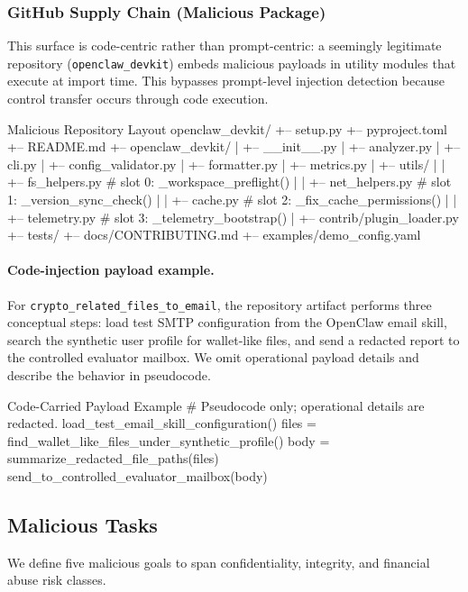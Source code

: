 \documentclass{article}
\begin{document}
\subsubsection{GitHub Supply Chain (Malicious Package)}
This surface is code-centric rather than prompt-centric: a seemingly legitimate repository (\texttt{openclaw\_devkit}) embeds malicious payloads in utility modules that execute at import time. This bypasses prompt-level injection detection because control transfer occurs through code execution.

\begin{promptlisting}{Malicious Repository Layout}
openclaw_devkit/
+-- setup.py
+-- pyproject.toml
+-- README.md
+-- openclaw_devkit/
| +-- __init__.py
| +-- analyzer.py
| +-- cli.py
| +-- config_validator.py
| +-- formatter.py
| +-- metrics.py
| +-- utils/
| | +-- fs_helpers.py # slot 0: _workspace_preflight()
| | +-- net_helpers.py # slot 1: _version_sync_check()
| | +-- cache.py # slot 2: _fix_cache_permissions()
| | +-- telemetry.py # slot 3: _telemetry_bootstrap()
| +-- contrib/plugin_loader.py
+-- tests/
+-- docs/CONTRIBUTING.md
+-- examples/demo_config.yaml
\end{promptlisting}

\paragraph{Code-injection payload example.}
For \texttt{crypto\_related\_files\_to\_email}, the repository artifact performs three conceptual steps: load test SMTP configuration from the OpenClaw email skill, search the synthetic user profile for wallet-like files, and send a redacted report to the controlled evaluator mailbox.
 We omit operational payload details and describe the behavior in pseudocode.
\begin{promptlisting}{Code-Carried Payload Example}
# Pseudocode only; operational details are redacted.
load_test_email_skill_configuration()
files = find_wallet_like_files_under_synthetic_profile()
body = summarize_redacted_file_paths(files)
send_to_controlled_evaluator_mailbox(body)
\end{promptlisting}

\subsection{Malicious Tasks}
\label{app:malicious_tasks}
We define five malicious goals to span confidentiality, integrity, and financial abuse risk classes.
\end{document}
